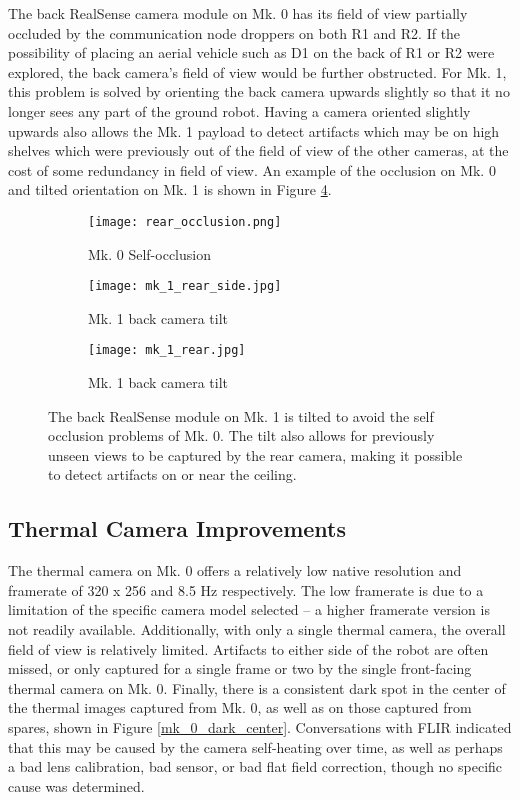 The back RealSense camera module on Mk. 0 has its field of view partially occluded by the communication node droppers on both R1 and R2. If the possibility of placing an aerial vehicle such as D1 on the back of R1 or R2 were explored, the back camera's field of view would be further obstructed. For Mk. 1, this problem is solved by orienting the back camera upwards slightly so that it no longer sees any part of the ground robot. Having a camera oriented slightly upwards also allows the Mk. 1 payload to detect artifacts which may be on high shelves which were previously out of the field of view of the other cameras, at the cost of some redundancy in field of view. An example of the occlusion on Mk. 0 and tilted orientation on Mk. 1 is shown in Figure \ref{mk_1_rear_tilt}.

\begin{figure}
	\centering
	\begin{subfigure}{0.32\textwidth}
		\centering
		\texttt{[image: rear\_occlusion.png]}
		\caption{Mk. 0 Self-occlusion}
		\label{rear_occlusion}
	\end{subfigure}
	\hfill
	\begin{subfigure}{0.32\textwidth}
		\centering
		\texttt{[image: mk\_1\_rear\_side.jpg]}
		\caption{Mk. 1 back camera tilt}
		\label{mk_1_rear_side}
	\end{subfigure}		
	\hfill
	\begin{subfigure}{0.32\textwidth}
		\centering
		\texttt{[image: mk\_1\_rear.jpg]}
		\caption{Mk. 1 back camera tilt}
		\label{mk_1_rear}
	\end{subfigure}	
	\caption[Tilting back RGB camera on Mk. 1]{The back RealSense module on Mk. 1 is tilted to avoid the self occlusion problems of Mk. 0. The tilt also allows for previously unseen views to be captured by the rear camera, making it possible to detect artifacts on or near the ceiling.}
	\label{mk_1_rear_tilt}
\end{figure}

\subsection{Thermal Camera Improvements}

The thermal camera on Mk. 0 offers a relatively low native resolution and framerate of 320 x 256 and 8.5 Hz respectively. The low framerate is due to a limitation of the specific camera model selected -- a higher framerate version is not readily available. Additionally, with only a single thermal camera, the overall field of view is relatively limited. Artifacts to either side of the robot are often missed, or only captured for a single frame or two by the single front-facing thermal camera on Mk. 0. Finally, there is a consistent dark spot in the center of the thermal images captured from Mk. 0, as well as on those captured from spares, shown in Figure \ref{mk_0_dark_center}. Conversations with FLIR indicated that this may be caused by the camera self-heating over time, as well as perhaps a bad lens calibration, bad sensor, or bad flat field correction, though no specific cause was determined.

